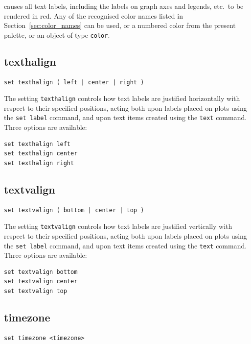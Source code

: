 \noindent causes all text labels, including the labels on graph axes and
legends, etc.\ to be rendered in red. Any of the recognised color names listed
in Section~\ref{sec:color_names} can be used, or a numbered color from the present palette, or an object of type {\tt color}.


\subsection{texthalign}

\begin{verbatim}
set texthalign ( left | center | right )
\end{verbatim}

The setting {\tt texthalign} controls how text labels are justified
horizontally with respect to their specified positions, acting both upon labels
placed on plots using the {\tt set label} command, and upon text items created
using the {\tt text} command. Three options are available:

\begin{verbatim}
set texthalign left
set texthalign center
set texthalign right
\end{verbatim}


\subsection{textvalign}

\begin{verbatim}
set textvalign ( bottom | center | top )
\end{verbatim}

The setting {\tt textvalign} controls how text labels are justified vertically
with respect to their specified positions, acting both upon labels placed on
plots using the {\tt set label} command, and upon text items created using the
{\tt text} command. Three options are available:

\begin{verbatim}
set textvalign bottom
set textvalign center
set textvalign top
\end{verbatim}


\subsection{timezone}

\begin{verbatim}
set timezone <timezone>
\end{verbatim}

